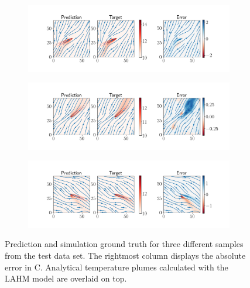 \documentclass{article} %
\begin{document}
\begin{figure}[!htb]
   \centering
   \begin{subfigure}{0.9\textwidth}
      \includegraphics[width=\textwidth]{img/19_comparison_test.png}
      \vspace{-1cm}
   \end{subfigure}
   \begin{subfigure}{0.9\textwidth}
      \includegraphics[width=\textwidth]{img/32_comparison_test.png}
      \vspace{-1cm}
   \end{subfigure}
   \begin{subfigure}{0.9\textwidth}
      \includegraphics[width=\textwidth]{img/29_comparison_test.png}
      \vspace{-1cm}
   \end{subfigure}
   \caption{Prediction and simulation ground truth for three different samples from the test data set. The rightmost column displays the absolute error in \degree C. Analytical temperature plumes calculated with the LAHM model are overlaid on top.}
   \label{fig:results}
\end{figure}
\end{document}
